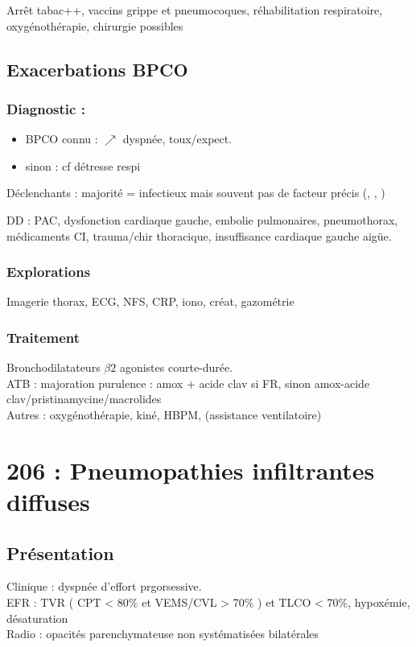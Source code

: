 \documentclass{article}
\begin{document}
Arrêt tabac++, vaccins grippe et pneumocoques, réhabilitation respiratoire, oxygénothérapie, chirurgie possibles

\subsection{Exacerbations BPCO}
\label{subsec:ebpco}
\subsubsection{Diagnostic :}
\begin{itemize}
\item BPCO connu : \(\nearrow\) dyspnée, toux/expect.
\item sinon : cf détresse respi
\end{itemize}

Déclenchants : majorité = infectieux mais souvent pas de facteur précis
(, , )

DD : PAC, dysfonction cardiaque gauche, embolie pulmonaires, pneumothorax, médicaments CI, trauma/chir thoracique, insuffisance cardiaque gauche aigüe.

\subsubsection{Explorations}
Imagerie thorax, ECG, NFS, CRP, iono, créat, gazométrie

\subsubsection{Traitement}
Bronchodilatateurs $\beta2$ agonistes courte-durée.\\
ATB : majoration purulence : amox + acide clav si FR, sinon amox-acide
clav/pristinamycine/macrolides\\
Autres \faHospitalO : oxygénothérapie, kiné, HBPM, (assistance ventilatoire)

\section{206 : Pneumopathies infiltrantes diffuses}
\subsection{Présentation}
Clinique : dyspnée d'effort prgorsessive.\\
EFR : \gls{TVR} ( CPT < 80\% et VEMS/CVL >
70\% ) et TLCO < 70\%, hypoxémie, désaturation\\
Radio : opacités parenchymateuse non systématisées bilatérales
\end{document}
